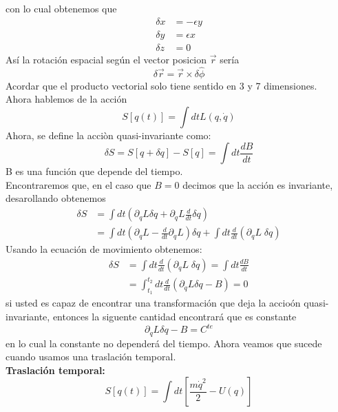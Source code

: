 \documentclass[../main.tex]{subfiles}
\begin{document}
con lo cual obtenemos que
\begin{align}
    \delta x  & = - \epsilon y \\
    \delta y  & = \epsilon x \\
    \delta z &  = 0
\end{align}
Así la rotación espacial según el vector posicion $\vec{r}$ sería 
\begin{equation}
    \delta \vec{r} = \vec{r} \times \delta \hat{\phi}
\end{equation}
Acordar que el producto vectorial solo tiene sentido en 3 y 7 dimensiones. \\
Ahora hablemos de la acción 
\begin{equation}
    S [q(t)] = \int dt L(q,\dot{q})
\end{equation}
Ahora, se define la acciòn quasi-invariante como:
\begin{equation}
    \delta S = S[q+ \delta q] - S [q] = \int dt \frac{dB}{dt}
\end{equation}
B es una función que depende del tiempo. \\
Encontraremos que, en el caso que $B=0$ decimos que la acción es invariante, desarollando obtenemos
\begin{align}
    \delta S &  = \int dt \left( \partial_q L \delta q + \partial_{\dot{q}} L \frac{d}{dt} \delta q \right) \\
    & = \int dt \left(   \partial_q L - \frac{d}{dt} \partial_{\dot{q}} L  \right) \delta q + \int dt \frac{d}{dt} \left(  \partial_{\dot{q}}L \; \delta q\right)
\end{align}
Usando la ecuación de movimiento obtenemos:
\begin{align}
    \delta S & = \int dt  \frac{d}{dt}\left(   \partial_{\dot{q}}L \;\delta q \right) = \int dt \frac{dB}{dt} \\
     & =  \int_{t_1}^{t_2} dt \frac{d}{dt} \left(  \partial_{\dot{q}} L \delta q - B\right) = 0
\end{align}
si usted es capaz de encontrar una transformación que deja la accioón quasi-invariante, entonces la siguente cantidad encontrará que es constante
\begin{equation}
    \partial_{\dot{q}}L \delta q - B = C^{te}
\end{equation}
en lo cual la constante no dependerá del tiempo.
Ahora veamos que sucede cuando usamos una traslación temporal. \\
\textbf{Traslación temporal: }
\begin{equation}
    S[q(t)] = \int dt \left[\frac{m \dot{q}^2}{2} - U(q) \right] 
\end{equation}
\end{document}
